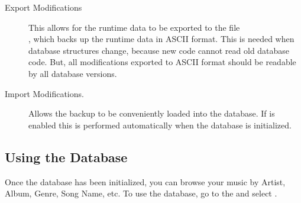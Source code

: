 \begin{description}
\item[Export Modifications]
  This allows for the runtime data to be exported to the file \\
  , which backs up the runtime data in
  ASCII format. This is needed when database structures change, because new
  code cannot read old database code. But, all modifications
  exported to ASCII format should be readable by all database versions.
  
\item[Import Modifications.]
  Allows the  backup to be 
  conveniently loaded into the database. If  is
  enabled this is performed automatically when the database is initialized.
  
\end{description}

\subsection{Using the Database}
Once the database has been initialized, you can browse your music 
by Artist, Album, Genre, Song Name, etc.  To use the database, go to the
  and select .\\

%

